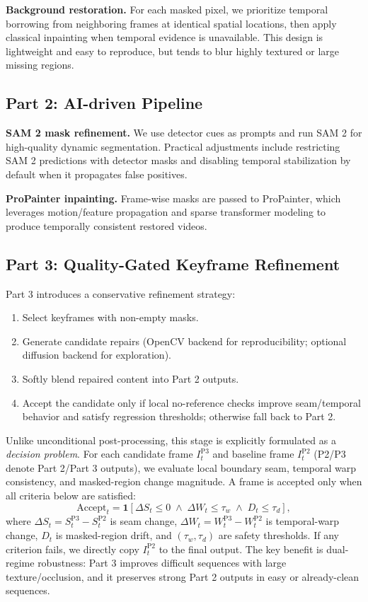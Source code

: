\documentclass[10pt,twocolumn,letterpaper]{article}
\begin{document}
\textbf{Background restoration.}
For each masked pixel, we prioritize temporal borrowing from neighboring frames at identical spatial locations, then apply classical inpainting when temporal evidence is unavailable. This design is lightweight and easy to reproduce, but tends to blur highly textured or large missing regions.

\subsection{Part 2: AI-driven Pipeline}
\textbf{SAM 2 mask refinement.}
We use detector cues as prompts and run SAM 2 for high-quality dynamic segmentation. Practical adjustments include restricting SAM 2 predictions with detector masks and disabling temporal stabilization by default when it propagates false positives.

\textbf{ProPainter inpainting.}
Frame-wise masks are passed to ProPainter, which leverages motion/feature propagation and sparse transformer modeling to produce temporally consistent restored videos.

\subsection{Part 3: Quality-Gated Keyframe Refinement}
Part 3 introduces a conservative refinement strategy:
\begin{enumerate}
    \item Select keyframes with non-empty masks.
    \item Generate candidate repairs (OpenCV backend for reproducibility; optional diffusion backend for exploration).
    \item Softly blend repaired content into Part 2 outputs.
    \item Accept the candidate only if local no-reference checks improve seam/temporal behavior and satisfy regression thresholds; otherwise fall back to Part 2.
\end{enumerate}
Unlike unconditional post-processing, this stage is explicitly formulated as a \emph{decision problem}. For each candidate frame $I_t^{\text{P3}}$ and baseline frame $I_t^{\text{P2}}$ (P2/P3 denote Part 2/Part 3 outputs), we evaluate local boundary seam, temporal warp consistency, and masked-region change magnitude. A frame is accepted only when all criteria below are satisfied:
\begin{equation}
\label{eq:gate}
\mathrm{Accept}_t=\mathbf{1}\!\left[
\Delta S_t \le 0 \;\wedge\;
\Delta W_t \le \tau_w \;\wedge\;
D_t \le \tau_d
\right],
\end{equation}
where $\Delta S_t=S_t^{\text{P3}}-S_t^{\text{P2}}$ is seam change, $\Delta W_t=W_t^{\text{P3}}-W_t^{\text{P2}}$ is temporal-warp change, $D_t$ is masked-region drift, and $(\tau_w,\tau_d)$ are safety thresholds.
If any criterion fails, we directly copy $I_t^{\text{P2}}$ to the final output. The key benefit is dual-regime robustness: Part 3 improves difficult sequences with large texture/occlusion, and it preserves strong Part 2 outputs in easy or already-clean sequences.
\end{document}
